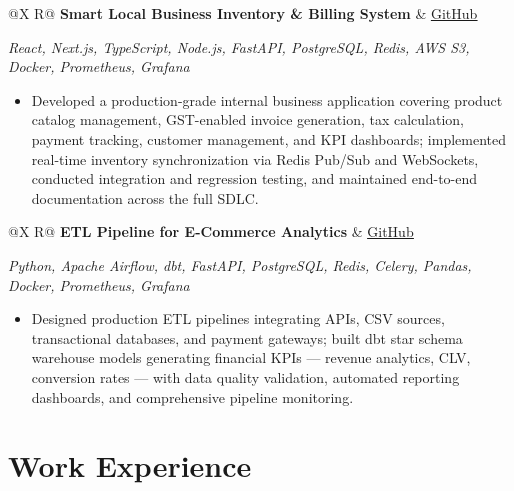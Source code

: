 \documentclass[a4paper,10pt]{article}
\newcommand{\ulink}[2]{\href{#1}{\uline{#2}}}
\newcommand{\subheading}[1]{{\color[HTML]{0A0A0A}\fontsize{12}{14}\selectfont\bfseries #1}}
\newcommand{\techstack}[1]{{\color[HTML]{5C5C5C}\fontsize{10.5}{12.5}\selectfont\itshape #1}}
\newcommand{\meta}[1]{{\color[HTML]{5C5C5C}\fontsize{10.5}{12.5}\selectfont #1}}
\begin{document}
\vspace{4pt}

\begin{tabularx}{\linewidth}{@{}X R@{}}
  \subheading{Smart Local Business Inventory \& Billing System} &
  \meta{\ulink{https://github.com/su-jin1425/Smart-Local-Business-Inventory-Billing-System}{GitHub}}
\end{tabularx}
\vspace{1pt}
\techstack{React, Next.js, TypeScript, Node.js, FastAPI, PostgreSQL, Redis, AWS S3, Docker, Prometheus, Grafana}
\begin{itemize}[nosep, leftmargin=1.5em, itemsep=1pt, topsep=2pt]
  \item {\color[HTML]{0A0A0A}\fontsize{11}{14}\selectfont Developed a production-grade internal business application covering product catalog management, GST-enabled invoice generation, tax calculation, payment tracking, customer management, and KPI dashboards; implemented real-time inventory synchronization via Redis Pub/Sub and WebSockets, conducted integration and regression testing, and maintained end-to-end documentation across the full SDLC.}
\end{itemize}

\vspace{4pt}

\begin{tabularx}{\linewidth}{@{}X R@{}}
  \subheading{ETL Pipeline for E-Commerce Analytics} &
  \meta{\ulink{https://github.com/su-jin1425/ETL-Pipeline-for-E-Commerce-Analytics}{GitHub}}
\end{tabularx}
\vspace{1pt}
\techstack{Python, Apache Airflow, dbt, FastAPI, PostgreSQL, Redis, Celery, Pandas, Docker, Prometheus, Grafana}
\begin{itemize}[nosep, leftmargin=1.5em, itemsep=1pt, topsep=2pt]
  \item {\color[HTML]{0A0A0A}\fontsize{11}{14}\selectfont Designed production ETL pipelines integrating APIs, CSV sources, transactional databases, and payment gateways; built dbt star schema warehouse models generating financial KPIs --- revenue analytics, CLV, conversion rates --- with data quality validation, automated reporting dashboards, and comprehensive pipeline monitoring.}
\end{itemize}

\vspace{2pt}

\section{Work Experience}
\vspace{2pt}
\end{document}
